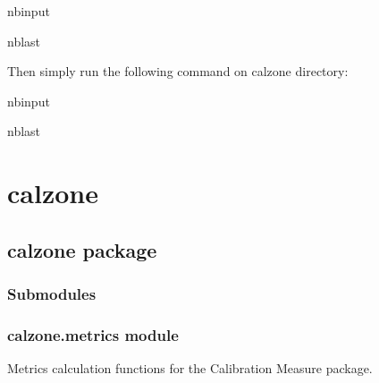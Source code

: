\documentclass[letterpaper,10pt,english]{sphinxmanual}
\begin{document}
\begin{sphinxuseclass}{nbinput}
\begin{sphinxuseclass}{nblast}
{
\begin{sphinxVerbatim}[commandchars=\\\{\}]
\llap{\color{nbsphinxin}[ ]:\,\hspace{\fboxrule}\hspace{\fboxsep}}  
\end{sphinxVerbatim}
}

\end{sphinxuseclass}
\end{sphinxuseclass}
\sphinxAtStartPar
Then simply run the following command on calzone directory:

\begin{sphinxuseclass}{nbinput}
\begin{sphinxuseclass}{nblast}
{
\begin{sphinxVerbatim}[commandchars=\\\{\}]
\llap{\color{nbsphinxin}[ ]:\,\hspace{\fboxrule}\hspace{\fboxsep}} 
\end{sphinxVerbatim}
}

\end{sphinxuseclass}
\end{sphinxuseclass}
\sphinxstepscope


\chapter{calzone}
\label{\detokenize{modules:calzone}}\label{\detokenize{modules::doc}}
\sphinxstepscope


\section{calzone package}
\label{\detokenize{calzone:calzone-package}}\label{\detokenize{calzone::doc}}

\subsection{Submodules}
\label{\detokenize{calzone:submodules}}

\subsection{calzone.metrics module}
\label{\detokenize{calzone:module-calzone.metrics}}\label{\detokenize{calzone:calzone-metrics-module}}
\sphinxAtStartPar
Metrics calculation functions for the Calibration Measure package.
\end{document}
